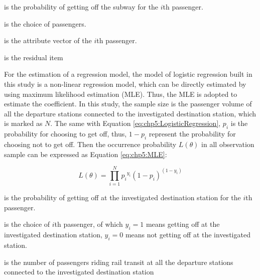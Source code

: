 \begin{description}
	\setlength{\parskip}{0\baselineskip} %
	\normalsize
	\item[\textbf{Where:}]
	\item[$p_i$] is the probability of getting off the subway for the $i$th passenger.
	\item[$y$] is the choice of passengers.
	\item[$X_i$] is the attribute vector of the $i$th passenger.
	\item[$\alpha$] is the residual item
	\setlength{\parskip}{0.7\baselineskip} %
\end{description}

%
For the estimation of a regression model, the model of logistic regression built in this study is a non-linear regression model, which can be directly estimated by using maximum likelihood estimation (MLE). Thus, the MLE is adopted to estimate the coefficient. In this study, the sample size is the passenger volume of all the departure stations connected to the investigated destination station, which is marked as $N$. The same with Equation \ref{eq:chp5:LogisticRegression}, $p_i$ is the probability for choosing to get off, thus, $1-p_i$ represent the probability for choosing not to get off. Then the occurrence probability $L(\theta)$ in all observation sample can be expressed as Equation \ref{eq:chp5:MLE}:

\begin{equation}
	L(\theta)=\prod_{i=1}^{N}{p_i}^{y_i}(1-p_i)^{(1-y_i)}
	\label{eq:chp5:MLE}
\end{equation}

\begin{description}
	\setlength{\parskip}{0\baselineskip} %
	\normalsize
	\item[\textbf{Where:}]
	\item[$p_i$] is the probability of getting off at the investigated destination station for the $i$th passenger.
	\item[$y_i$] is the choice of $i$th passenger, of which $y_i = 1$ means getting off at the investigated destination station, $y_i = 0$ means not getting off at the investigated station.
	\item[$N$] is the number of passengers riding rail transit at all the departure stations connected to the investigated destination station
	\setlength{\parskip}{0.7\baselineskip} %
\end{description}

